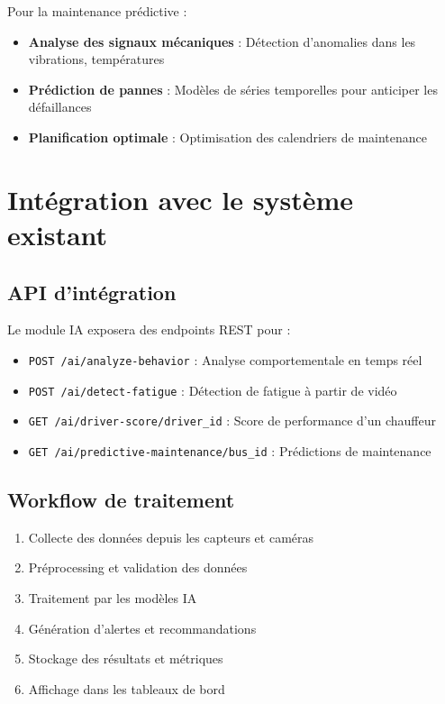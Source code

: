 \documentclass[a4paper, 12pt]{book}
\begin{document}
Pour la maintenance prédictive :
\begin{itemize}
    \item \textbf{Analyse des signaux mécaniques} : Détection d'anomalies dans les vibrations, températures
    \item \textbf{Prédiction de pannes} : Modèles de séries temporelles pour anticiper les défaillances
    \item \textbf{Planification optimale} : Optimisation des calendriers de maintenance
\end{itemize}

\section{Intégration avec le système existant}

\subsection{API d'intégration}

Le module IA exposera des endpoints REST pour :
\begin{itemize}
    \item \texttt{POST /ai/analyze-behavior} : Analyse comportementale en temps réel
    \item \texttt{POST /ai/detect-fatigue} : Détection de fatigue à partir de vidéo
    \item \texttt{GET /ai/driver-score/{driver\_id}} : Score de performance d'un chauffeur
    \item \texttt{GET /ai/predictive-maintenance/{bus\_id}} : Prédictions de maintenance
\end{itemize}

\subsection{Workflow de traitement}

\begin{enumerate}
    \item Collecte des données depuis les capteurs et caméras
    \item Préprocessing et validation des données
    \item Traitement par les modèles IA
    \item Génération d'alertes et recommandations
    \item Stockage des résultats et métriques
    \item Affichage dans les tableaux de bord
\end{enumerate}
\end{document}
